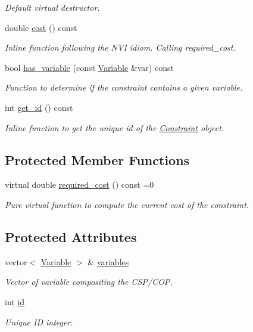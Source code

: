 \begin{DoxyCompactItemize}
\begin{DoxyCompactList}\small\item\em Default virtual destructor. \end{DoxyCompactList}\item 
double \hyperlink{classghost_1_1Constraint_adfa4826bcaea9e4a692fb0c4630ca214}{cost} () const 
\begin{DoxyCompactList}\small\item\em Inline function following the N\+VI idiom. Calling required\+\_\+cost. \end{DoxyCompactList}\item 
bool \hyperlink{classghost_1_1Constraint_a38945fa5e732b91d51c0eedfec9a99e3}{has\+\_\+variable} (const \hyperlink{classghost_1_1Variable}{Variable} \&var) const 
\begin{DoxyCompactList}\small\item\em Function to determine if the constraint contains a given variable. \end{DoxyCompactList}\item 
int \hyperlink{classghost_1_1Constraint_af483429a319284503ff634105cadbe08}{get\+\_\+id} () const 
\begin{DoxyCompactList}\small\item\em Inline function to get the unique id of the \hyperlink{classghost_1_1Constraint}{Constraint} object. \end{DoxyCompactList}\end{DoxyCompactItemize}
\subsection*{Protected Member Functions}
\begin{DoxyCompactItemize}
\item 
virtual double \hyperlink{classghost_1_1Constraint_a6ef4cd03a4dc864a8d308e55044c615d}{required\+\_\+cost} () const =0
\begin{DoxyCompactList}\small\item\em Pure virtual function to compute the current cost of the constraint. \end{DoxyCompactList}\end{DoxyCompactItemize}
\subsection*{Protected Attributes}
\begin{DoxyCompactItemize}
\item 
vector$<$ \hyperlink{classghost_1_1Variable}{Variable} $>$ \& \hyperlink{classghost_1_1Constraint_aff0c784579a9d69524be3dc9c0068302}{variables}
\begin{DoxyCompactList}\small\item\em Vector of variable compositing the C\+S\+P/\+C\+OP. \end{DoxyCompactList}\item 
int \hyperlink{classghost_1_1Constraint_a5215df3cd5269adb4c5f6168191b9d47}{id}
\begin{DoxyCompactList}\small\item\em Unique ID integer. \end{DoxyCompactList}\end{DoxyCompactItemize}
